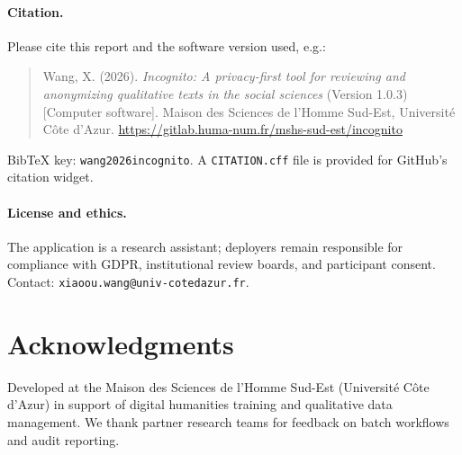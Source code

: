 \documentclass[11pt,a4paper]{article}
\begin{document}
\paragraph{Citation.}
Please cite this report and the software version used, e.g.:
\begin{quote}
\small
Wang, X. (2026).
\textit{Incognito: A privacy-first tool for reviewing and anonymizing qualitative texts in the social sciences}
(Version 1.0.3) [Computer software].
Maison des Sciences de l'Homme Sud-Est, Universit\'{e} C\^{o}te d'Azur.
\url{https://gitlab.huma-num.fr/mshs-sud-est/incognito}
\end{quote}
\noindent Bib\TeX{} key: \texttt{wang2026incognito}.
A \texttt{CITATION.cff} file is provided for GitHub's citation widget.

\paragraph{License and ethics.}
The application is a research assistant; deployers remain responsible for compliance
with GDPR, institutional review boards, and participant consent.
Contact: \texttt{xiaoou.wang@univ-cotedazur.fr}.

\section*{Acknowledgments}

Developed at the Maison des Sciences de l'Homme Sud-Est (Universit\'{e} C\^{o}te
d'Azur) in support of digital humanities training and qualitative data management.
We thank partner research teams for feedback on batch workflows and audit reporting.



\end{document}
